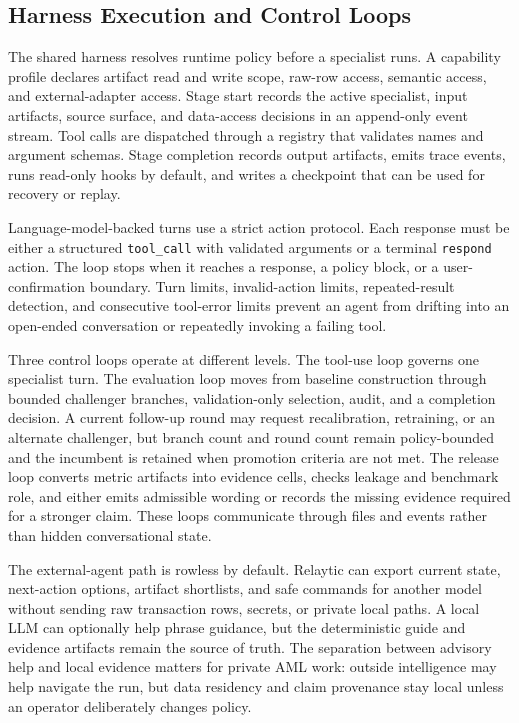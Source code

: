 \documentclass[11pt]{article}
\begin{document}
\subsection{Harness Execution and Control Loops}

The shared harness resolves runtime policy before a specialist runs. A capability profile declares artifact read and write scope, raw-row access, semantic access, and external-adapter access. Stage start records the active specialist, input artifacts, source surface, and data-access decisions in an append-only event stream. Tool calls are dispatched through a registry that validates names and argument schemas. Stage completion records output artifacts, emits trace events, runs read-only hooks by default, and writes a checkpoint that can be used for recovery or replay.

Language-model-backed turns use a strict action protocol. Each response must be either a structured \nolinkurl{tool_call} with validated arguments or a terminal \nolinkurl{respond} action. The loop stops when it reaches a response, a policy block, or a user-confirmation boundary. Turn limits, invalid-action limits, repeated-result detection, and consecutive tool-error limits prevent an agent from drifting into an open-ended conversation or repeatedly invoking a failing tool.

Three control loops operate at different levels. The tool-use loop governs one specialist turn. The evaluation loop moves from baseline construction through bounded challenger branches, validation-only selection, audit, and a completion decision. A current follow-up round may request recalibration, retraining, or an alternate challenger, but branch count and round count remain policy-bounded and the incumbent is retained when promotion criteria are not met. The release loop converts metric artifacts into evidence cells, checks leakage and benchmark role, and either emits admissible wording or records the missing evidence required for a stronger claim. These loops communicate through files and events rather than hidden conversational state.

The external-agent path is rowless by default. Relaytic can export current state, next-action options, artifact shortlists, and safe commands for another model without sending raw transaction rows, secrets, or private local paths. A local LLM can optionally help phrase guidance, but the deterministic guide and evidence artifacts remain the source of truth. The separation between advisory help and local evidence matters for private AML work: outside intelligence may help navigate the run, but data residency and claim provenance stay local unless an operator deliberately changes policy.
\end{document}
